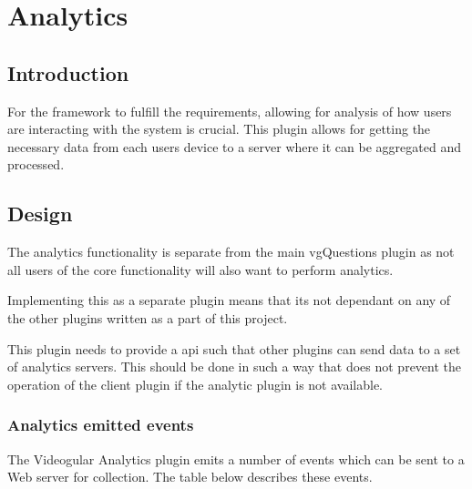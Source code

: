 
\chapter{Analytics} \label{Chapter: Analytics}

\begin{preamble}
\end{preamble}

\section{Introduction}

For the framework to fulfill the requirements, allowing for analysis of how users are interacting with the system is crucial. This plugin allows for getting the necessary data from each users device to a server where it can be aggregated and processed.

\section{Design}

The analytics functionality is separate from the main vgQuestions plugin as not all users of the core functionality will also want to perform analytics.

Implementing this as a separate plugin means that its not dependant on any of the other plugins written as a part of this project.

This plugin needs to provide a api such that other plugins can send data to a set of analytics servers. This should be done in such a way that does not prevent the operation of the client plugin if the analytic plugin is not available.

\subsection{Analytics emitted events}

The Videogular Analytics plugin emits a number of events which can be sent to a Web server for collection. The table below describes these events.

